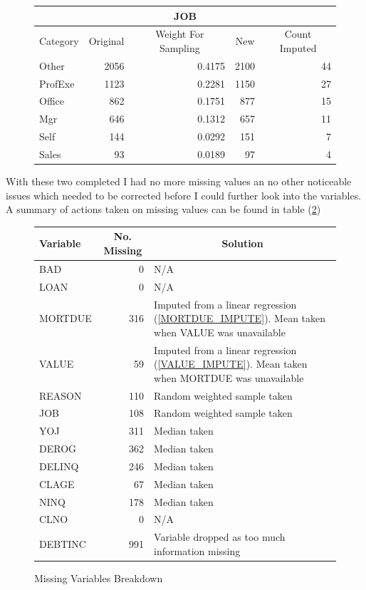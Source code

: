 \begin{figure}[ht]\label{JOB_IMPUTES}
	\centering
	\renewcommand{\arraystretch}{1.25}
	\begin{tabular}{lrrrr}
	\multicolumn{5}{c}{JOB}\\
	\hline
	Category & \multicolumn{1}{c}{Original} & \multicolumn{1}{c}{Weight For Sampling} & \multicolumn{1}{c}{New} & \multicolumn{1}{c}{Count Imputed} \\ 
	\hline
	Other & 2056 & 0.4175 & 2100 & 44 \\
	ProfExe & 1123 & 0.2281 & 1150 & 27 \\
	Office & 862 & 0.1751 & 877 & 15 \\
	Mgr & 646 & 0.1312 & 657  & 11 \\
	Self & 144 & 0.0292 & 151  & 7 \\
	Sales & 93 & 0.0189 & 97 & 4 \\
	\end{tabular}
\end{figure}

With these two completed I had no more missing values an no other noticeable issues which needed to be corrected before I could further look into the variables. A summary of actions taken on missing values can be found in table (\ref{DataCleanSummary}) \\

\begin{figure}[ht]\label{data_clean}
	\centering
	\renewcommand{\arraystretch}{1.25}
	\begin{tabular}{l r p{9cm}}
	\hline
	Variable & \multicolumn{1}{c}{No. Missing} & \multicolumn{1}{c}{Solution}\\ 
	\hline
	BAD & 0 & N/A\\
	LOAN & 0 & N/A \\
	MORTDUE & 316 & Imputed from a linear regression (\ref{MORTDUE_IMPUTE}). Mean taken when VALUE was unavailable \\
	VALUE & 59 & Imputed from a linear regression (\ref{VALUE_IMPUTE}). Mean taken when MORTDUE was unavailable \\
	REASON & 110 & Random weighted sample taken \\
	JOB & 108 & Random weighted sample taken \\
	YOJ & 311 & Median taken\\
	DEROG & 362 & Median taken \\
	DELINQ & 246 & Median taken\\
	CLAGE & 67 & Median taken \\
	NINQ & 178 & Median taken\\
	CLNO & 0 & N/A \\
	DEBTINC & 991 & Variable dropped as too much information missing\\
	\end{tabular}
	\caption{Missing Variables Breakdown \label{DataCleanSummary}}
\end{figure}

